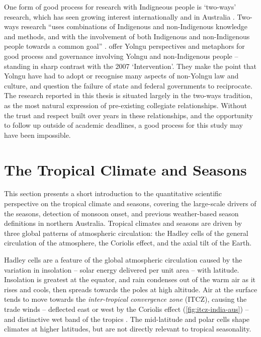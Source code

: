 One form of good process for research with Indigneous people is `two-ways'
research, which has seen growing interest internationally and in Australia
\citep{turner2009,prober2011}.  Two-ways research ``uses combinations of
Indigenous and non-Indigenous knowledge and methods, and with the involvement
of both Indigenous and non-Indigenous people towards a common goal''
\citep{ens2014}.
%
\citet{marika2009} offer Yolngu perspectives and metaphors for good process
and governance involving Yolngu and non-Indigenous people -- standing in sharp
contrast with the 2007 `Intervention'.  They make the point that Yolngu have
had to adopt or recognise many aspects of non-Yolngu law and culture, and
question the failure of state and federal governments to reciprocate.
%
The research reported in this thesis is situated largely in the two-ways tradition, as the most
natural expression of pre-existing collegiate relationships.  Without the
trust and respect built over years in these relationships, and the opportunity
to follow up outside of academic deadlines, a good process for this study
may have been impossible.



\section{The Tropical Climate and Seasons}
\label{sec:lit-tropical-climate}

This section presents a short introduction to the quantitative scientific
perspective on the tropical climate and seasons, covering the large-scale
drivers of the seasons, detection of monsoon onset, and previous
weather-based season definitions in northern Australia.
%
Tropical climates and seasons are driven by three global patterns of
atmospheric circulation:  the Hadley cells of the general circulation of
the atmosphere, the Coriolis effect, and the axial tilt of the Earth.

Hadley cells are a feature of the global atmospheric circulation
caused by the variation in insolation -- solar energy delivered per unit area --
with latitude.  Insolation is greatest at the equator, and rain condenses out
of the warm air as it rises and cools, then spreads towards the poles at high altitude.
Air at the surface tends to move towards the \textit{inter-tropical
convergence zone} (ITCZ), causing the trade winds -- deflected east or west
by the Coriolis effect (\cref{fig:itcz-india-aus}) -- and distinctive wet band
of the tropics \citep{kump2010}.  The mid-latitude and polar cells shape climates at higher
latitudes, but are not directly relevant to tropical seasonality.

